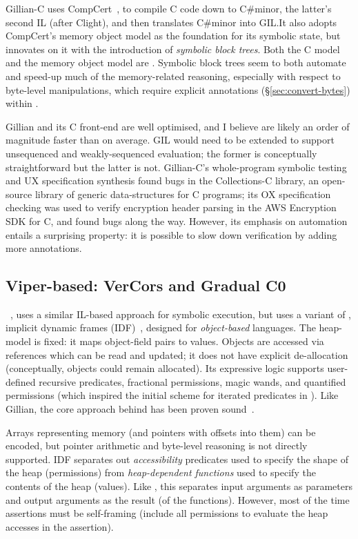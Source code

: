 Gillian-C uses CompCert~, to compile C code down to
C\#minor, the latter's second IL (after Clight), and then translates C\#minor
into GIL.\@ It also adopts CompCert's memory object model as the foundation for
its symbolic state, but innovates on it with the introduction of \emph{symbolic
block trees}. Both the C model and the memory object model are \adhoc.
Symbolic block trees seem to both automate and speed-up much of the
memory-related reasoning, especially with respect to byte-level manipulations,
which require explicit annotations (\S\ref{sec:convert-bytes}) within .

Gillian and its C front-end are well optimised, and I believe are likely an
order of magnitude faster than  on average. GIL would need to be
extended to support unsequenced and weakly-sequenced evaluation; the former is
conceptually straightforward but the latter is not. Gillian-C's
whole-program symbolic testing and UX specification synthesis found bugs in the
Collections-C library, an open-source library of generic data-structures for C
programs; its OX specification checking was used to verify encryption header
parsing in the AWS Encryption SDK for C, and found bugs along the way. However,
its emphasis on automation entails a surprising property: it is possible to
slow down verification by adding more annotations.

\subsection{Viper-based: VerCors and Gradual C0}


~, uses a similar IL-based approach for symbolic
execution, but uses a variant of , implicit dynamic frames
(IDF)~, designed for \emph{object-based} languages.
The heap-model is fixed: it maps object-field pairs to values. Objects are
accessed via references which can be read and updated; it does not have
explicit de-allocation (conceptually, objects could remain allocated). Its
expressive logic supports user-defined recursive predicates, fractional
permissions, magic wands, and quantified permissions (which inspired the
initial scheme for iterated predicates in ). Like Gillian, the core
approach behind  has been proven sound~.

Arrays representing memory (and pointers with offsets into them) can be
encoded, but pointer arithmetic and byte-level reasoning is not directly
supported. IDF separates out \emph{accessibility} predicates \textemdash{} used
to specify the shape of the heap (permissions) \textemdash{} from
\emph{heap-dependent functions} \textemdash{} used to specify the contents of
the heap (values). Like , this separates input arguments as parameters
and output arguments as the result (of the functions). However, most of the
time assertions must be self-framing (include all permissions to evaluate the
heap accesses in the assertion).

